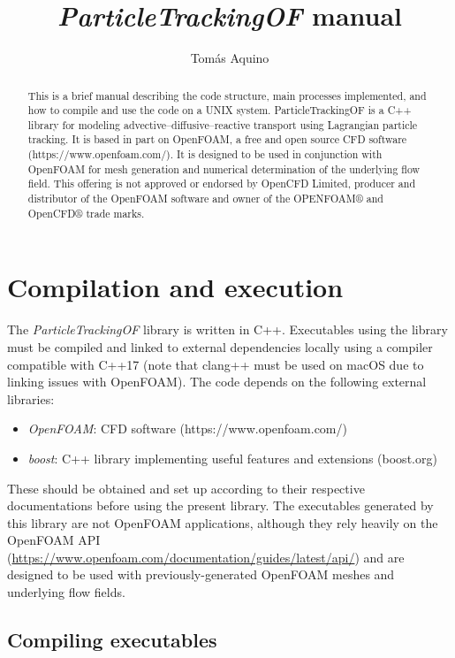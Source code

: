 \documentclass[11pt]{article}
\title{\textit{ParticleTrackingOF} manual}
\author{Tom\'as Aquino}
\begin{document}
\maketitle

\begin{abstract}
This is a brief manual describing the code structure, main processes implemented, and how to compile and use the code on a UNIX system. ParticleTrackingOF is a C++ library for modeling advective--diffusive--reactive transport using Lagrangian particle tracking. It is based in part on OpenFOAM, a free and open source CFD software (https://www.openfoam.com/). It is designed to be used in conjunction with OpenFOAM for mesh generation and numerical determination of the underlying flow field. This offering is not approved or endorsed by OpenCFD Limited, producer and distributor of the OpenFOAM software and owner of the OPENFOAM®  and OpenCFD® trade marks.
\end{abstract}

\section{Compilation and execution}
\label{s::compilation}

The \textit{ParticleTrackingOF} library is written in C++. Executables using the library must be compiled and linked to external dependencies locally using a compiler compatible with C++17  (note that clang++ must be used on macOS due to linking issues with OpenFOAM). The code depends on the following external libraries:
%
\begin{itemize}
\item \emph{OpenFOAM}: CFD software (https://www.openfoam.com/)
\item \emph{boost}: C++ library implementing useful features and extensions (boost.org)
\end{itemize}
These should be obtained and set up according to their respective documentations before using the present library. The executables generated by this library are not OpenFOAM applications, although they rely heavily on the OpenFOAM API (\url{https://www.openfoam.com/documentation/guides/latest/api/}) and are designed to be used with previously-generated OpenFOAM meshes and underlying flow fields.

\subsection{Compiling executables}
\end{document}
